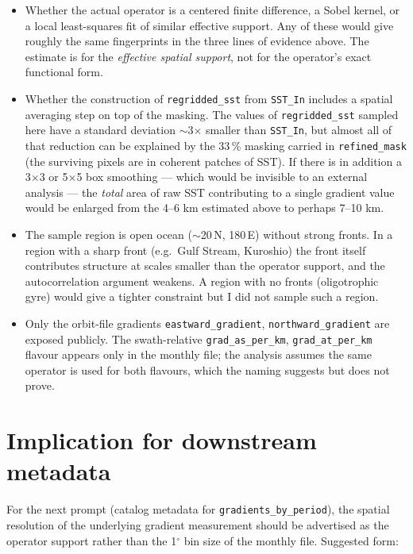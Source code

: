 \documentclass[11pt]{article}
\begin{document}
\begin{itemize}
  \item Whether the actual operator is a centered finite
    difference, a Sobel kernel, or a local least-squares fit of
    similar effective support. Any of these would give roughly the
    same fingerprints in the three lines of evidence above. The
    estimate is for the \emph{effective spatial support}, not for
    the operator's exact functional form.
  \item Whether the construction of
    \texttt{regridded\_sst} from \texttt{SST\_In} includes a
    spatial averaging step on top of the masking. The values
    of \texttt{regridded\_sst} sampled here have a standard
    deviation $\sim$3$\times$ smaller than \texttt{SST\_In}, but
    almost all of that reduction can be explained by the 33\,\%
    masking carried in \texttt{refined\_mask} (the surviving
    pixels are in coherent patches of SST). If there is in
    addition a 3$\times$3 or 5$\times$5 box smoothing
    --- which would be invisible to an external analysis ---
    the \emph{total} area of raw SST contributing to a single
    gradient value would be enlarged from the 4--6 km estimated
    above to perhaps 7--10 km.
  \item The sample region is open ocean
    ($\sim$20\,N, 180\,E) without strong fronts. In a region
    with a sharp front (e.g.\ Gulf Stream, Kuroshio) the
    front itself contributes structure at scales smaller than
    the operator support, and the autocorrelation argument
    weakens. A region with no fronts (oligotrophic gyre) would
    give a tighter constraint but I did not sample such a
    region.
  \item Only the orbit-file gradients
    \texttt{eastward\_gradient}, \texttt{northward\_gradient}
    are exposed publicly. The swath-relative
    \texttt{grad\_as\_per\_km}, \texttt{grad\_at\_per\_km}
    flavour appears only in the monthly file; the analysis
    assumes the same operator is used for both flavours, which
    the naming suggests but does not prove.
\end{itemize}

\section{Implication for downstream metadata}\label{sec:impl}

For the next prompt (catalog metadata for
\texttt{gradients\_by\_period}), the spatial resolution of the
underlying gradient measurement should be advertised as the
operator support rather than the 1$^\circ$ bin size of the monthly
file. Suggested form:
\end{document}
